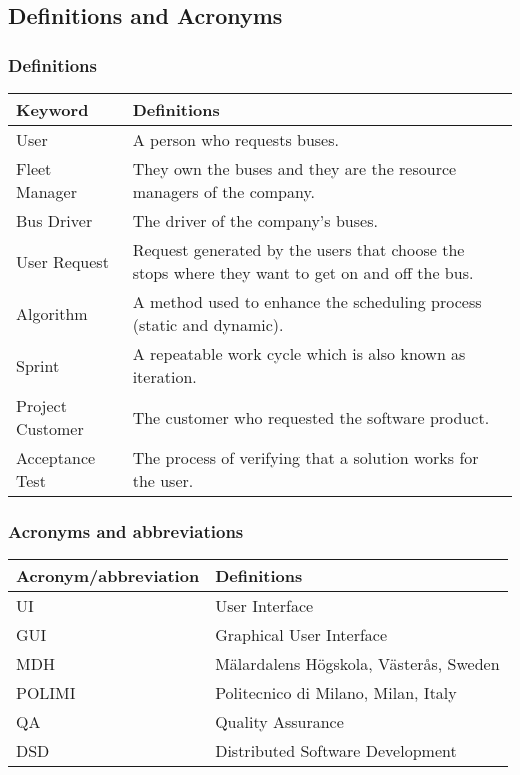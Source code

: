 \subsection{Definitions and Acronyms}

\subsubsection{Definitions}
\begin{center}
	\begin{tabular} { | m{3.5cm} | m{9.5cm} | }
		\hline
		\textbf{Keyword} & \textbf{Definitions}\\
		\hline
		User & A person who requests buses.\\
		\hline
		Fleet Manager & They own the buses and they are the resource managers of the company.\\
		\hline
		Bus Driver & The driver of the company's buses.\\
		\hline
		User Request & Request generated by the users that choose the stops where they want to get on and off the bus.\\
		\hline
		Algorithm & A method used to enhance the scheduling process (static and dynamic).\\
		\hline
		Sprint & A repeatable work cycle which is also known as iteration.\\
		\hline
		Project Customer & The customer who requested the software product.\\
		\hline
		Acceptance Test & The process of verifying that a solution works for the user.\\
		\hline
	\end{tabular}
\end{center}
\subsubsection{Acronyms and abbreviations}
\begin{center}
	\begin{tabular} { | m{5cm} | m{8cm} | }
		\hline
		\textbf{Acronym/abbreviation} & \textbf{Definitions}\\
		\hline
		UI & User Interface\\
		\hline
		GUI & Graphical User Interface\\
		\hline
		MDH & Mälardalens Högskola, Västerås, Sweden\\
		\hline
		POLIMI & Politecnico di Milano, Milan, Italy\\
		\hline
		QA & Quality Assurance\\
		\hline
		DSD & Distributed Software Development\\
		\hline
	\end{tabular}
\end{center}